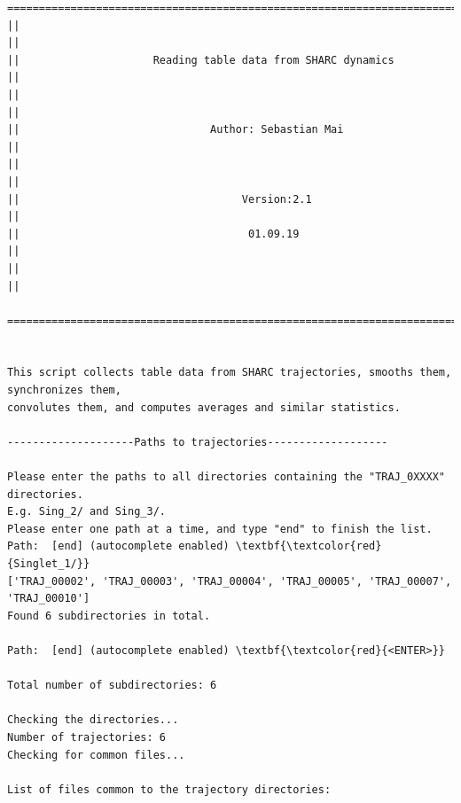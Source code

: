 \documentclass[a4paper,11pt,DIV=15,openany]{scrbook}
\begin{document}
\begin{oframed}
\footnotesize\begin{Verbatim}[commandchars=\\\{\}]
  ================================================================================
||                                                                                ||
||                     Reading table data from SHARC dynamics                     ||
||                                                                                ||
||                              Author: Sebastian Mai                             ||
||                                                                                ||
||                                   Version:2.1                                  ||
||                                    01.09.19                                    ||
||                                                                                ||
  ================================================================================


This script collects table data from SHARC trajectories, smooths them, synchronizes them,
convolutes them, and computes averages and similar statistics.
  
--------------------Paths to trajectories-------------------

Please enter the paths to all directories containing the "TRAJ_0XXXX" directories.
E.g. Sing_2/ and Sing_3/. 
Please enter one path at a time, and type "end" to finish the list.
Path:  [end] (autocomplete enabled) \textbf{\textcolor{red}{Singlet_1/}}
['TRAJ_00002', 'TRAJ_00003', 'TRAJ_00004', 'TRAJ_00005', 'TRAJ_00007', 'TRAJ_00010']
Found 6 subdirectories in total.

Path:  [end] (autocomplete enabled) \textbf{\textcolor{red}{<ENTER>}}

Total number of subdirectories: 6

Checking the directories...
Number of trajectories: 6
Checking for common files...

List of files common to the trajectory directories:


\end{Verbatim}
\end{oframed}
\end{document}
